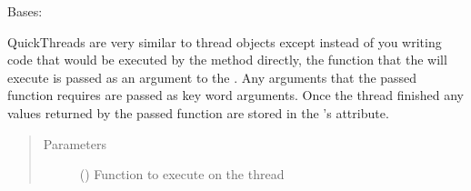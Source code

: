 \documentclass[letterpaper,10pt,english]{sphinxmanual}
\begin{document}
\begin{fulllineitems}
\label{\detokenize{polo.threads:polo.threads.thread.QuickThread}}
Bases: {\hyperref[\detokenize{polo.threads:polo.threads.thread.thread}]{}}

QuickThreads are very similar
to thread objects except instead of you writing code that would be
executed by the  method directly, the function that the 
will execute is passed as an argument to the . Any arguments
that the passed function requires are passed as key word arguments. Once
the thread finished any values returned by the passed function are stored
in the ’s 
attribute.

\begin{sphinxVerbatim}[commandchars=\\\{\}]
       
    
    
\end{sphinxVerbatim}
\begin{quote}\begin{description}
\item[{Parameters}] \leavevmode
{} () \textendash{} Function to execute on the thread

\end{description}\end{quote}

\begin{fulllineitems}
\label{\detokenize{polo.threads:polo.threads.thread.QuickThread.run}}
\end{fulllineitems}


\end{fulllineitems}
\end{document}
